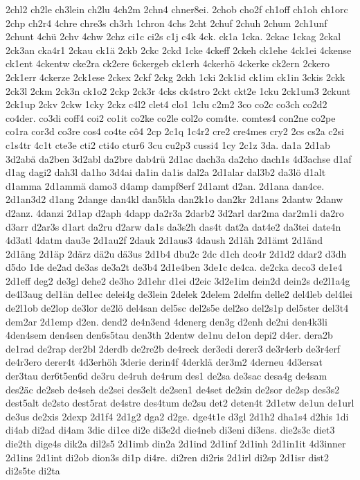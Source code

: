 {2chl2
ch2le
ch3lein
ch2lu
4ch2m
2chn4
chner8ei.
2chob
cho2f
ch1off
ch1oh
ch1orc
2chp
ch2r4
4chre
chre3s
ch3rh
1chron
4chs
2cht
2chuf
2chuh
2chum
2ch1unf
2chunt
4chü
2chv
4chw
2chz
ci1c
ci2s
c1j
c4k
4ck.
ck1a
1cka.
2ckac
1ckag
2ckal
2ck3an
cka4r1
2ckau
ck1ä
2ckb
2ckc
2ckd
1cke
4ckeff
2ckeh
ck1ehe
4ck1ei
4ckense
ck1ent
4ckentw
cke2ra
ck2ere
6ckergeb
ck1erh
4ckerhö
4ckerke
ck2ern
2ckero
2ck1err
4ckerze
2ck1ese
2ckex
2ckf
2ckg
2ckh
1cki
2ck1id
ck1im
ck1in
3ckis
2ckk
2ck3l
2ckm
2ck3n
ck1o2
2ckp
2ck3r
4cks
ck4stro
2ckt
ckt2e
1cku
2ck1um3
2ckunt
2ck1up
2ckv
2ckw
1cky
2ckz
c4l2
clet4
clo1
1clu
c2m2
3co
co2c
co3ch
co2d2
co4der.
co3di
coff4
coi2
co1it
co2ke
co2le
col2o
com4te.
comtes4
con2ne
co2pe
co1ra
cor3d
co3re
cos4
co4te
cô4
2cp
2c1q
1c4r2
cre2
cre4mes
cry2
2cs
cs2a
c2si
c1s4tr
4c1t
cte3e
cti2
cti4o
ctur6
3cu
cu2p3
cussi4
1cy
2c1z
3da.
da1a
2d1ab
3d2abä
da2ben
3d2abl
da2bre
dab4rü
2d1ac
dach3a
da2cho
dach1s
4d3achse
d1af
d1ag
dagi2
dah3l
da1ho
3d4ai
da1in
da1is
dal2a
2d1alar
dal3b2
da3lö
d1alt
d1amma
2d1ammä
damo3
d4amp
dampf8erf
2d1amt
d2an.
2d1ana
dan4ce.
2d1an3d2
d1ang
2dange
dan4kl
dan5kla
dan2k1o
dan2kr
2d1ans
2dantw
2danw
d2anz.
4danzi
2d1ap
d2aph
4dapp
da2r3a
2darb2
3d2arl
dar2ma
dar2m1i
da2ro
d3arr
d2ar3s
d1art
da2ru
d2arw
da1s
da3s2h
das4t
dat2a
dat4e2
da3tei
date4n
4d3atl
4datm
dau3e
2d1au2f
2dauk
2d1aus3
4daush
2d1äh
2d1ämt
2d1änd
2d1äng
2d1äp
2därz
dä2u
dä3us
2d1b4
dbu2c
2dc
d1ch
dco4r
2d1d2
ddar2
d3dh
d5do
1de
de2ad
de3as
de3a2t
de3b4
2d1e4ben
3de1c
de4ca.
de2cka
deco3
de1e4
2d1eff
deg2
de3gl
dehe2
de3ho
2d1ehr
d1ei
d2eic
3d2e1im
dein2d
dein2s
de2l1a4g
de4l3aug
del1än
del1ec
delei4g
de3lein
2delek
2delem
2delfm
delle2
del4leb
del4lei
de2l1ob
de2lop
de3lor
de2lö
del4san
del5sc
del2s5e
del2so
del2s1p
del5ster
del3t4
dem2ar
2d1emp
d2en.
dend2
de4n3end
4denerg
den3g
d2enh
de2ni
den4k3li
4den4sem
den4sen
den6s5tau
den3th
2dentw
de1nu
de1on
depi2
d4er.
dera2b
de1rad
de2rap
der2bl
2derdb
de2re2b
de4reck
der3edi
derer3
de3r4erb
de3r4erf
de4r3ero
derer4t
4d3erhöh
3derie
derin4f
4derklä
der3m2
4derneu
4d3ersat
der3tau
der6t5en6d
de3ru
de4ruh
de4rum
des1
de2sa
de3sac
desa4g
de4sam
des2äc
de2seb
de4seh
de2sei
des3elt
de2sen1
de4set
de2sin
de2sor
de2sp
des3s2
dest5alt
de2sto
dest5rat
de4stre
des4tum
de2su
det2
deten4t
2d1etw
de1un
de1url
de3us
de2xis
2dexp
2d1f4
2d1g2
dga2
d2ge.
dge4t1e
d3gl
2d1h2
dha1s4
d2his
1di
di4ab
di2ad
di4am
3dic
di1ce
di2e
di3e2d
die4neb
di3eni
di3ens.
die2s3c
diet3
die2th
dige4s
dik2a
dil2s5
2d1imb
din2a
2d1ind
2d1inf
2d1inh
2d1in1it
4d3inner
2d1ins
2d1int
di2ob
dion3s
di1p
di4re.
di2ren
di2ris
2d1irl
di2sp
2d1isr
dist2
di2s5te
di2ta
}
